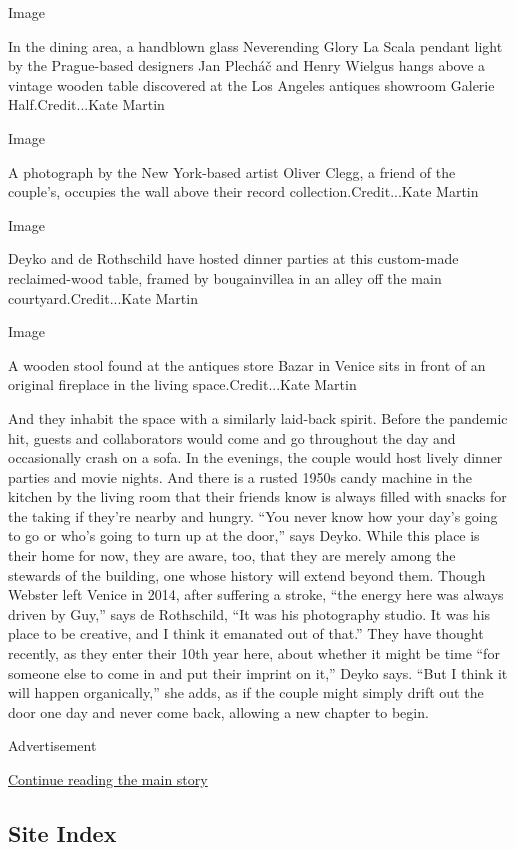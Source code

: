Image

In the dining area, a handblown glass Neverending Glory La Scala pendant
light by the Prague-based designers Jan Plecháč and Henry Wielgus hangs
above a vintage wooden table discovered at the Los Angeles antiques
showroom Galerie Half.Credit...Kate Martin

Image

A photograph by the New York-based artist Oliver Clegg, a friend of the
couple's, occupies the wall above their record collection.Credit...Kate
Martin

Image

Deyko and de Rothschild have hosted dinner parties at this custom-made
reclaimed-wood table, framed by bougainvillea in an alley off the main
courtyard.Credit...Kate Martin

Image

A wooden stool found at the antiques store Bazar in Venice sits in front
of an original fireplace in the living space.Credit...Kate Martin

And they inhabit the space with a similarly laid-back spirit. Before the
pandemic hit, guests and collaborators would come and go throughout the
day and occasionally crash on a sofa. In the evenings, the couple would
host lively dinner parties and movie nights. And there is a rusted 1950s
candy machine in the kitchen by the living room that their friends know
is always filled with snacks for the taking if they're nearby and
hungry. ``You never know how your day's going to go or who's going to
turn up at the door,'' says Deyko. While this place is their home for
now, they are aware, too, that they are merely among the stewards of the
building, one whose history will extend beyond them. Though Webster left
Venice in 2014, after suffering a stroke, ``the energy here was always
driven by Guy,'' says de Rothschild, ``It was his photography studio. It
was his place to be creative, and I think it emanated out of that.''
They have thought recently, as they enter their 10th year here, about
whether it might be time ``for someone else to come in and put their
imprint on it,'' Deyko says. ``But I think it will happen organically,''
she adds, as if the couple might simply drift out the door one day and
never come back, allowing a new chapter to begin.

Advertisement

\protect\hyperlink{after-bottom}{Continue reading the main story}

\hypertarget{site-index}{%
\subsection{Site Index}\label{site-index}}


